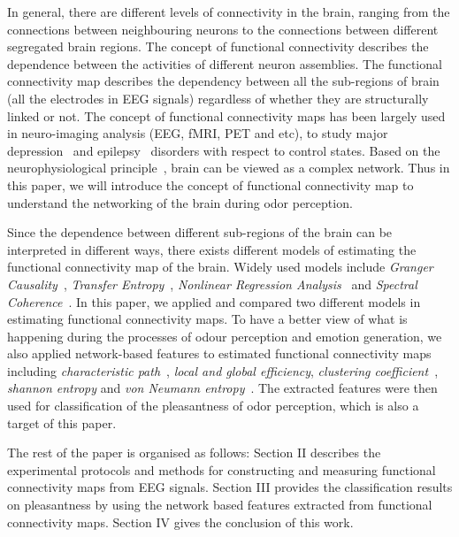 In general, there are different levels of connectivity in the brain, ranging from the connections between neighbouring neurons to the connections between different segregated brain regions. The concept of functional connectivity describes the dependence between the activities of different neuron assemblies. The functional connectivity map describes the dependency between all the sub-regions of brain (all the electrodes in EEG signals) regardless of whether they are structurally linked or not. The concept of functional connectivity maps has been largely used in neuro-imaging analysis (EEG, fMRI, PET and etc), to study major depression~\cite{greicius2007resting} and epilepsy~\cite{waites2006functional} disorders with respect to control states. Based on the neurophysiological principle~\cite{van2010exploring}, brain can be viewed as a complex network. Thus in this paper, we will introduce the concept of functional connectivity map to understand the networking of the brain during odor perception.

Since the dependence between different sub-regions of the brain can be interpreted in different ways, there exists different models of estimating the functional connectivity map of the brain. Widely used models include \emph{Granger Causality}~\cite{granger1969investigating}, \emph{Transfer Entropy}~\cite{schreiber2000measuring}, \emph{Nonlinear Regression Analysis}~\cite{pijn1990localization} and \emph{Spectral Coherence}~\cite{sun2004measuring}. In this paper, we applied and compared two different models in estimating functional connectivity maps. To have a better view of what is happening during the processes of odour perception and emotion generation, we also applied network-based features to estimated functional connectivity maps including \emph{characteristic path}~\cite{watts1998collective}, \emph{local and global efficiency}, \emph{clustering coefficient}~\cite{latora2001efficient}, \emph{shannon entropy} and \emph{von Neumann entropy}~\cite{passerini2008neumann}. The extracted features were then used for classification of the pleasantness of odor perception, which is also a target of this paper. 

The rest of the paper is organised as follows: Section II describes the experimental protocols and methods for constructing and measuring functional connectivity maps from EEG signals. Section III provides the classification results on pleasantness by using the network based features extracted from functional connectivity maps. Section IV gives the conclusion of this work. 